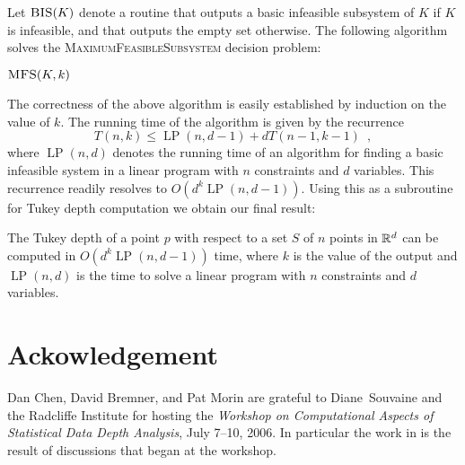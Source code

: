 \documentclass[charterfonts,lotsofwhite]{patmorin}
\DeclareMathOperator{\lp}{LP}
\begin{document}
Let $\textsc{BIS}(K)$ denote a routine that outputs a basic infeasible
subsystem of $K$ if $K$ is infeasible, and that outputs the empty set
otherwise.  The following algorithm solves the
\textsc{MaximumFeasibleSubsystem} decision problem:

\noindent\begin{minipage}{\textwidth}
\noindent$\textsc{MFS}(K,k)$
\begin{algorithmic}[1]
\ENDIF
{}
\ENDIF
{}
   \ENDIF
\ENDFOR
{}
\end{algorithmic}
\end{minipage}

The correctness of the above algorithm is easily established by
induction on the value of $k$.  The running time of the algorithm is
given by the recurrence
\[
    T(n,k) \le \lp(n,d-1)+ dT(n-1,k-1) \enspace ,
\]
where $\lp(n,d)$ denotes the running time of an algorithm for finding
a basic infeasible system in a linear program with $n$ constraints and
$d$ variables.  This recurrence readily resolves to
$O(d^k\lp(n,d-1))$.  
Using this as a subroutine for Tukey depth computation we obtain our
final result:

\begin{thm}
The Tukey depth of a point $p$ with respect to a set $S$ of $n$ points
in $\mathbb{R}^d$ can be computed in $O(d^k\lp(n,d-1))$ time, where $k$ is
the value of the output and $\lp(n,d)$ is the time to solve a linear
program with $n$ constraints and $d$ variables.
\end{thm}

\section*{Ackowledgement}

Dan Chen, David Bremner, and Pat Morin are grateful to Diane~Souvaine
and the Radcliffe Institute for hosting the \emph{Workshop on
Computational Aspects of Statistical Data Depth Analysis}, July 7--10,
2006.  In particular the work in  is the result of
discussions that began at the workshop.



\end{document}
